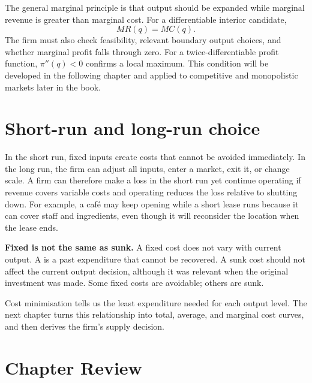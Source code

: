 The general marginal principle is that output should be expanded while marginal
revenue is greater than marginal cost. For a differentiable interior
candidate,
\[
MR(q)=MC(q).
\]
The firm must also check feasibility, relevant boundary output choices, and
whether marginal profit falls through zero. For a twice-differentiable profit
function, $\pi''(q)<0$ confirms a local maximum. This condition will be
developed in the following chapter and applied to competitive and monopolistic
markets later in the book.

\section{Short-run and long-run choice}

In the short run, fixed inputs create costs that cannot be avoided immediately.
In the long run, the firm can adjust all inputs, enter a market, exit it, or
change scale. A firm can therefore make a loss in the short run yet continue
operating if revenue covers variable costs and operating reduces the loss
relative to shutting down. For example, a caf\'e may keep opening while a
short lease runs because it can cover staff and ingredients, even though it
will reconsider the location when the lease ends.

\begin{keyidea}
\textbf{Fixed is not the same as sunk.}
A fixed cost does not vary with current output. A  is a
past expenditure that cannot be recovered. A sunk cost should not affect the
current output decision, although it was relevant when the original investment
was made. Some fixed costs are avoidable; others are sunk.
\end{keyidea}

Cost minimisation tells us the least expenditure needed for each output level.
The next chapter turns this relationship into total, average, and marginal
cost curves, and then derives the firm's supply decision.

\section*{Chapter Review}

